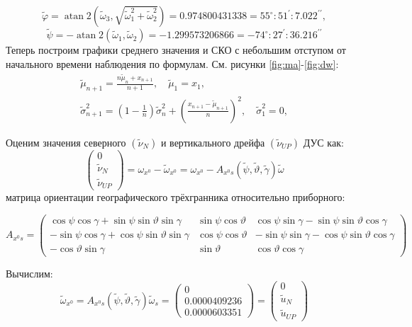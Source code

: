 \documentclass[a4paper,14pt]{article}
\theoremstyle{plain} %
\theoremstyle{definition} %
\theoremstyle{remark} %
\begin{document}
{$$
    \tilde{\varphi}=\operatorname{atan} 2\left(\widetilde{\omega}_{3}, \sqrt{\widetilde{\omega}_{1}^{2}+\widetilde{\omega}_{2}^{2}}\right)=0.974800431338=55^{\circ}: 51^{\prime}: 7.022^{\prime \prime},
$$
$$
    \widetilde{\psi}=-\operatorname{atan} 2\left(\widetilde{\omega}_{1}, \widetilde{\omega}_{2}\right)=-1.299573206866=-74^{\circ}: 27^{\prime}: 36.216^{\prime \prime}$$
Теперь построим графики среднего значения и СКО с небольшим отступом от начального времени наблюдения по формулам. См. рисунки \eqref{fig:ma}-\eqref{fig:dw}:
$$
    \begin{gathered}
        \widetilde{\mu}_{n+1}=\frac{n \widetilde{\mu}_{n}+x_{n+1}}{n+1}, \quad \widetilde{\mu}_{1}=x_{1}, \\
        \widetilde{\sigma}_{n+1}^{2}=\left(1-\frac{1}{n}\right) \widetilde{\sigma}_{n}^{2}+\left(\frac{x_{n+1}-\widetilde{\mu}_{n+1}}{n}\right)^{2}, \quad \widetilde{\sigma}_{1}^{2}=0,
    \end{gathered}
$$

Оценим значения северного $\left(\widetilde{\nu}_{N}\right)$ и вертикального дрейфа $\left(\widetilde{\nu}_{U P}\right)$ ДУС как:
$$
    \left(\begin{array}{c}
            0                   \\
            \widetilde{\nu}_{N} \\
            \widetilde{\nu}_{U P}
        \end{array}\right)=\omega_{x^{0}}-\widetilde{\omega}_{x^{0}}=\omega_{x^{0}}-A_{x^{0} s}(\widetilde{\psi}, \widetilde{\vartheta}, \widetilde{\gamma}) \widetilde{\omega}
$$
матрица ориентации географического трёхгранника относительно приборного:

$$
    A_{x^{0} s}=\left(\begin{array}{ccc}
            \cos \psi \cos \gamma+\sin \psi \sin \vartheta \sin \gamma  & \sin \psi \cos \vartheta & \cos \psi \sin \gamma-\sin \psi \sin \vartheta \cos \gamma  \\
            -\sin \psi \cos \gamma+\cos \psi \sin \vartheta \sin \gamma & \cos \psi \cos \vartheta & -\sin \psi \sin \gamma-\cos \psi \sin \vartheta \cos \gamma \\
            -\cos \vartheta \sin \gamma                                 & \sin \vartheta           & \cos \vartheta \cos \gamma
        \end{array}\right)
$$

Вычислим:
$$
    \widetilde{\omega}_{x^{0}}=A_{x^{0} s}(\widetilde{\psi}, \widetilde{\vartheta}, \widetilde{\gamma}) \widetilde{\omega}_{s}=\left(\begin{array}{c}
            0            \\
            0.0000409236 \\
            0.0000603351
        \end{array}\right)=\left(\begin{array}{c}
            0             \\
            \tilde{u}_{N} \\
            \widetilde{u}_{U P}
        \end{array}\right)
$$

}
\end{document}
